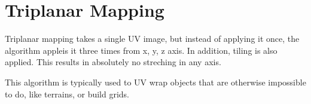 \section{Triplanar Mapping}

Triplanar mapping takes a single UV image, but instead of applying it once,
the algorithm appleis it three times from x, y, z axis. In addition,
tiling is also applied. This results in absolutely no streching in any
axis.

This algorithm is typically used to UV wrap objects that are otherwise
impossible to do, like terrains, or build grids.
